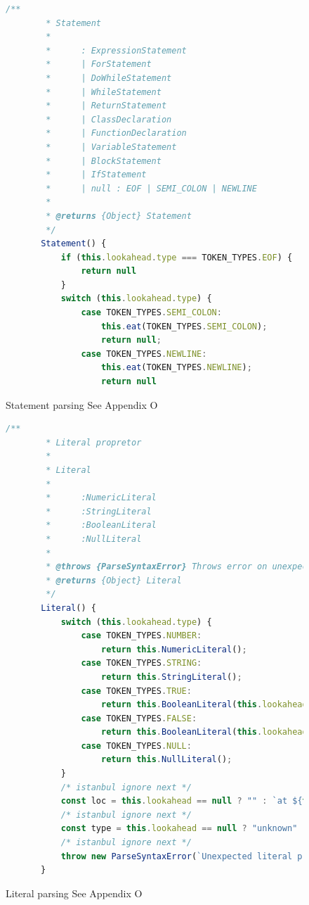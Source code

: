 \begin{figure}[h]
    \begin{lstlisting}[language=Javascript]
        /**
        * Statement 
        * 
        *      : ExpressionStatement
        *      | ForStatement
        *      | DoWhileStatement
        *      | WhileStatement
        *      | ReturnStatement
        *      | ClassDeclaration
        *      | FunctionDeclaration
        *      | VariableStatement
        *      | BlockStatement
        *      | IfStatement       
        *      | null : EOF | SEMI_COLON | NEWLINE
        *      
        * @returns {Object} Statement
        */
       Statement() {
           if (this.lookahead.type === TOKEN_TYPES.EOF) {
               return null
           }
           switch (this.lookahead.type) {
               case TOKEN_TYPES.SEMI_COLON:
                   this.eat(TOKEN_TYPES.SEMI_COLON);
                   return null;
               case TOKEN_TYPES.NEWLINE:
                   this.eat(TOKEN_TYPES.NEWLINE);
                   return null
    \end{lstlisting}
    \caption{Statement parsing See Appendix O}
    \label{fig:parser3}
\end{figure}
\begin{figure}[h]
    \begin{lstlisting}[language=Javascript]
        /**
        * Literal propretor 
        * 
        * Literal
        * 
        *      :NumericLiteral
        *      :StringLiteral
        *      :BooleanLiteral
        *      :NullLiteral
        * 
        * @throws {ParseSyntaxError} Throws error on unexpected literal production
        * @returns {Object} Literal 
        */
       Literal() {
           switch (this.lookahead.type) {
               case TOKEN_TYPES.NUMBER:
                   return this.NumericLiteral();
               case TOKEN_TYPES.STRING:
                   return this.StringLiteral();
               case TOKEN_TYPES.TRUE:
                   return this.BooleanLiteral(this.lookahead.type);
               case TOKEN_TYPES.FALSE:
                   return this.BooleanLiteral(this.lookahead.type);
               case TOKEN_TYPES.NULL:
                   return this.NullLiteral();
           }
           /* istanbul ignore next */
           const loc = this.lookahead == null ? "" : `at ${this.lookahead.loc.start.line}:${this.lookahead.loc.start.col}`;
           /* istanbul ignore next */
           const type = this.lookahead == null ? "unknown" : `"${this.lookahead.type}"`;
           /* istanbul ignore next */
           throw new ParseSyntaxError(`Unexpected literal production of type: ${this.lookahead.type} : ${this.lookahead.value} at ${this.lookahead.loc.start.line}:${this.lookahead.loc.start.column}`, this.lookahead)
       }       
    \end{lstlisting}
    \caption{Literal parsing See Appendix O}
    \label{fig:parser4}
\end{figure}
\newline
